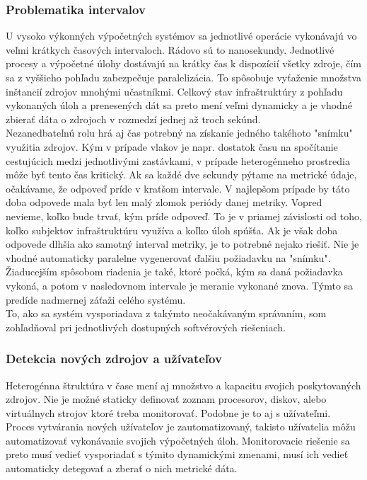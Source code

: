 \documentclass[11pt,final,oneside]{fithesis}
\begin{document}
\subsubsection{\textbf{Problematika intervalov}}
U vysoko výkonných výpočetných systémov sa jednotlivé operácie vykonávajú vo veľmi krátkych časových intervaloch. Rádovo sú to nanosekundy. Jednotlivé procesy a výpočetné úlohy dostávajú na krátky čas k dispozícií všetky zdroje, čím 
sa z vyššieho pohľadu zabezpečuje paralelizácia. To spôsobuje vyťaženie množstva inštancií zdrojov mnohými učastníkmi. Celkový stav infraštruktúry z pohľadu vykonaných úloh a prenesených dát sa preto mení veľmi dynamicky a je vhodné
zbierať dáta o zdrojoch v rozmedzí jednej až troch sekúnd. 
\\Nezanedbateľnú rolu hrá aj čas potrebný na získanie jedného takéhoto "snímku" využitia zdrojov. Kým v prípade vlakov je napr. dostatok času na spočítanie cestujúcich medzi jednotlivými zastávkami, v prípade heterogénneho prostredia 
môže byť tento čas kritický. Ak sa každé dve sekundy pýtame na metrické údaje, očakávame, že odpoveď príde v kratšom intervale. V najlepšom prípade by táto doba odpovede mala byť len malý zlomok periódy danej metriky. Vopred nevieme,
koľko bude trvať, kým príde odpoveď. To je v priamej závislosti od toho, koľko subjektov infraštruktúru využíva a koľko úloh spúšťa. Ak je však doba odpovede dlhšia ako samotný interval metriky, je to potrebné nejako riešiť. Nie je 
vhodné automaticky paralelne vygenerovať ďalšiu požiadavku na "snímku". Žiaducejším spôsobom riadenia je také, ktoré počká, kým sa daná požiadavka vykoná, a potom v nasledovnom intervale je meranie vykonané znova. Týmto sa predíde nadmernej záťaži
celého systému.
\\To, ako sa systém vysporiadava z takýmto neočakávaným správaním, som zohľadňoval pri jednotlivých dostupných softvérových riešeniach.

\subsubsection{\textbf{Detekcia nových zdrojov a užívateľov}}
Heterogénna štruktúra v čase mení aj množstvo a kapacitu svojich poskytovaných zdrojov. Nie je možné staticky definovať zoznam procesorov, diskov, alebo virtuálnych strojov ktoré treba monitorovať. Podobne je to aj s užívateľmi. Proces
vytvárania nových užívateľov je zautomatizovaný, takisto užívatelia môžu automatizovať vykonávanie svojich výpočetných úloh. Monitorovacie riešenie sa preto musí vedieť vysporiadať s týmito dynamickými zmenami, musí ich vedieť 
automaticky detegovať a zberať o nich metrické dáta.
\end{document}
